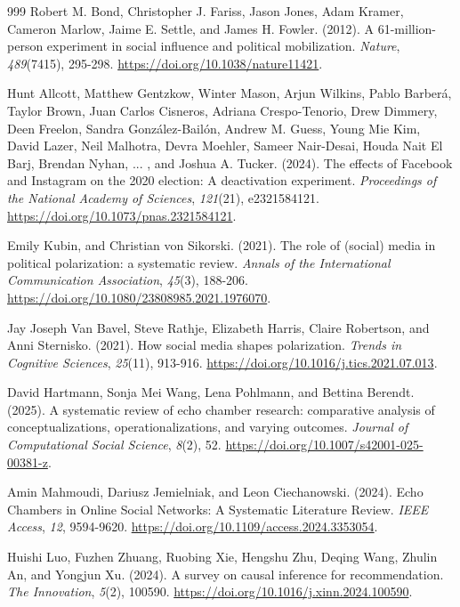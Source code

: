 \documentclass[10pt,a4paper]{article}
\begin{document}
\begin{thebibliography}{999}
Robert M. Bond, Christopher J. Fariss, Jason Jones, Adam Kramer, Cameron Marlow, Jaime E. Settle, and James H. Fowler. (2012). A 61-million-person experiment in social influence and political mobilization. \textit{Nature}, \textit{489}(7415), 295-298. \url{https://doi.org/10.1038/nature11421}.

Hunt Allcott, Matthew Gentzkow, Winter Mason, Arjun Wilkins, Pablo Barber\'{a}, Taylor Brown, Juan Carlos Cisneros, Adriana Crespo-Tenorio, Drew Dimmery, Deen Freelon, Sandra Gonz\'{a}lez-Bail\'{o}n, Andrew M. Guess, Young Mie Kim, David Lazer, Neil Malhotra, Devra Moehler, Sameer Nair-Desai, Houda Nait El Barj, Brendan Nyhan, ... , and Joshua A. Tucker. (2024). The effects of Facebook and Instagram on the 2020 election: A deactivation experiment. \textit{Proceedings of the National Academy of Sciences}, \textit{121}(21), e2321584121. \url{https://doi.org/10.1073/pnas.2321584121}.

Emily Kubin, and Christian von Sikorski. (2021). The role of (social) media in political polarization: a systematic review. \textit{Annals of the International Communication Association}, \textit{45}(3), 188-206. \url{https://doi.org/10.1080/23808985.2021.1976070}.

Jay Joseph Van Bavel, Steve Rathje, Elizabeth Harris, Claire Robertson, and Anni Sternisko. (2021). How social media shapes polarization. \textit{Trends in Cognitive Sciences}, \textit{25}(11), 913-916. \url{https://doi.org/10.1016/j.tics.2021.07.013}.

David Hartmann, Sonja Mei Wang, Lena Pohlmann, and Bettina Berendt. (2025). A systematic review of echo chamber research: comparative analysis of conceptualizations, operationalizations, and varying outcomes. \textit{Journal of Computational Social Science}, \textit{8}(2), 52. \url{https://doi.org/10.1007/s42001-025-00381-z}.

Amin Mahmoudi, Dariusz Jemielniak, and Leon Ciechanowski. (2024). Echo Chambers in Online Social Networks: A Systematic Literature Review. \textit{IEEE Access}, \textit{12}, 9594-9620. \url{https://doi.org/10.1109/access.2024.3353054}.

Huishi Luo, Fuzhen Zhuang, Ruobing Xie, Hengshu Zhu, Deqing Wang, Zhulin An, and Yongjun Xu. (2024). A survey on causal inference for recommendation. \textit{The Innovation}, \textit{5}(2), 100590. \url{https://doi.org/10.1016/j.xinn.2024.100590}.


\end{thebibliography}
\end{document}
